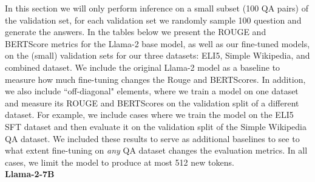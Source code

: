 \documentclass[11pt, oneside]{article}   	%
\begin{document}
In this section we will only perform inference on a small subset (100 QA pairs) of the validation set, for each validation set we randomly sample 100 question and generate the answers.
In the tables below we present the ROUGE and BERTScore metrics for the Llama-2 base model, as well as our fine-tuned models, on the (small) validation sets for our three datasets: ELI5, Simple Wikipedia, and combined dataset.
We include the original Llama-2 model as a baseline to measure how much fine-tuning changes the Rouge and BERTScores.
In addition, we also include ``off-diagonal" elements, where we train a model on one dataset and measure its ROUGE and BERTScores on the validation split of a different dataset.
For example, we include cases where we train the model on the ELI5 SFT dataset and then evaluate it on the validation split of the Simple Wikipedia QA dataset.
We included these results to serve as additional baselines to see to what extent fine-tuning on \textit{any} QA dataset changes the evaluation metrics.
In all cases, we limit the model to produce at most 512 new tokens.
\\[10pt]
\textbf{Llama-2-7B}
\end{document}
